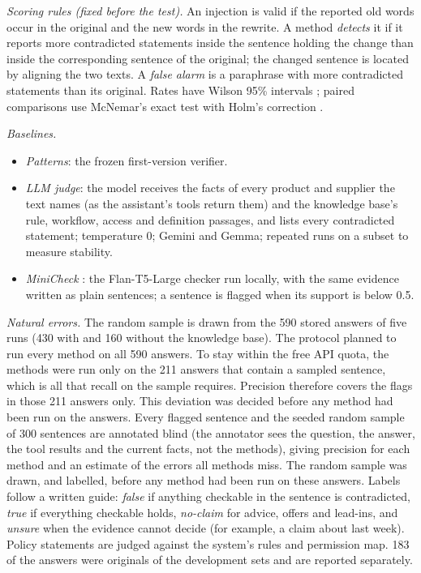 \documentclass[journal]{IEEEtran}
\renewcommand{\paragraph}[1]{\par\textit{#1}\enspace}
\begin{document}
\paragraph{Scoring rules (fixed before the test).} An injection is valid if the reported old words occur in
the original and the new words in the rewrite. A method \emph{detects} it if it reports more contradicted
statements inside the sentence holding the change than inside the corresponding sentence of the original;
the changed sentence is located by aligning the two texts. A \emph{false alarm} is a paraphrase with more
contradicted statements than its original. Rates have Wilson 95\% intervals \cite{wilson1927}; paired
comparisons use McNemar's exact test \cite{mcnemar1947} with Holm's correction \cite{holm1979}.

\paragraph{Baselines.}
\begin{itemize}
\item \emph{Patterns}: the frozen first-version verifier.
\item \emph{LLM judge}: the model receives the facts of every product and supplier the text names (as the
assistant's tools return them) and the knowledge base's rule, workflow, access and definition passages,
and lists every contradicted statement; temperature 0; Gemini and Gemma; repeated runs on a subset to
measure stability.
\item \emph{MiniCheck} \cite{tang2024minicheck}: the Flan-T5-Large checker run locally, with the same
evidence written as plain sentences; a sentence is flagged when its support is below 0.5.
\end{itemize}

\paragraph{Natural errors.} The random sample is drawn from the 590 stored answers of five runs (430 with
and 160 without the knowledge base). The protocol planned to run every method on all 590 answers. To stay
within the free API quota, the methods were run only on the 211 answers that contain a sampled sentence,
which is all that recall on the sample requires. Precision therefore covers the flags in those 211 answers
only. This deviation was decided before any method had been run on the answers. Every flagged sentence and the seeded random sample of 300 sentences are
annotated blind (the annotator sees the question, the answer, the tool results and the current facts, not
the methods), giving precision for each method and an estimate of the errors all methods miss. The random
sample was drawn, and labelled, before any method had been run on these answers. Labels follow a written
guide: \emph{false} if anything checkable in the sentence is contradicted, \emph{true} if everything
checkable holds, \emph{no-claim} for advice, offers and lead-ins, and \emph{unsure} when the evidence cannot
decide (for example, a claim about last week). Policy statements are judged against the system's rules and
permission map. 183 of the answers were originals of the development sets and are reported separately.
\end{document}
